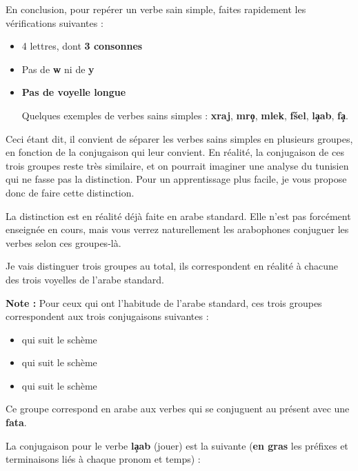 En conclusion, pour repérer un verbe sain simple, faites rapidement les vérifications suivantes :
\begin{itemize}
    \item 4 lettres, dont \textbf{3 consonnes}
    \item Pas de \textbf{w} ni de \textbf{y}
    \item \textbf{Pas de voyelle longue}

Quelques exemples de verbes sains simples : \textbf{xraj}, \textbf{mro\c{\dh}}, \textbf{mlek}, \textbf{f\v{s}el}, \textbf{l\c{a}ab}, \textbf{\textcrh fa\c{\dh}}.

\end{itemize}

Ceci étant dit, il convient de séparer les verbes sains simples en plusieurs groupes, en fonction de la conjugaison qui leur convient. En réalité, la conjugaison de ces trois groupes reste très similaire, et on pourrait imaginer une analyse du tunisien qui ne fasse pas la distinction. Pour un apprentissage plus facile, je vous propose donc de faire cette distinction.

La distinction est en réalité déjà faite en arabe standard. Elle n'est pas forcément enseignée en cours, mais vous verrez naturellement les arabophones conjuguer les verbes selon ces groupes-là.

Je vais distinguer trois groupes au total, ils correspondent en réalité à chacune des trois voyelles de l'arabe standard. 

\textbf{Note :} Pour ceux qui ont l'habitude de l'arabe standard, ces trois groupes correspondent aux trois conjugaisons suivantes : 
\begin{itemize}
    \item {} qui suit le schème 
    \item {} qui suit le schème 
    \item {} qui suit le schème 
\end{itemize}

Ce groupe correspond en arabe aux verbes qui se conjuguent au présent avec une \textbf{fat\textcrh a}.

La conjugaison pour le verbe \textbf{l\c{a}ab} (jouer) est la suivante (\textbf{en gras} les préfixes et terminaisons liés à chaque pronom et temps) :

